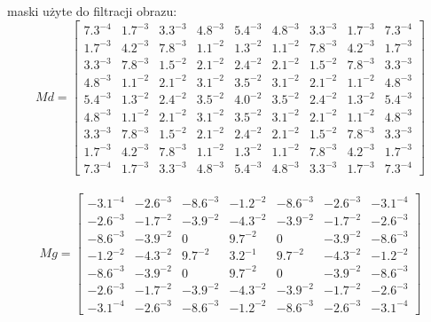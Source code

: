 \let\ww\undefined 
maski użyte do filtracji obrazu:
$$
Md = \begin{bmatrix}
7.3^{-4} & 1.7^{-3} & 3.3^{-3} & 4.8^{-3} & 5.4^{-3} & 4.8^{-3} & 3.3^{-3} & 1.7^{-3} & 7.3^{-4} \\ 
1.7^{-3} & 4.2^{-3} & 7.8^{-3} & 1.1^{-2} & 1.3^{-2} & 1.1^{-2} & 7.8^{-3} & 4.2^{-3} & 1.7^{-3} \\ 
3.3^{-3} & 7.8^{-3} & 1.5^{-2} & 2.1^{-2} & 2.4^{-2} & 2.1^{-2} & 1.5^{-2} & 7.8^{-3} & 3.3^{-3} \\ 
4.8^{-3} & 1.1^{-2} & 2.1^{-2} & 3.1^{-2} & 3.5^{-2} & 3.1^{-2} & 2.1^{-2} & 1.1^{-2} & 4.8^{-3} \\ 
5.4^{-3} & 1.3^{-2} & 2.4^{-2} & 3.5^{-2} & 4.0^{-2} & 3.5^{-2} & 2.4^{-2} & 1.3^{-2} & 5.4^{-3} \\ 
4.8^{-3} & 1.1^{-2} & 2.1^{-2} & 3.1^{-2} & 3.5^{-2} & 3.1^{-2} & 2.1^{-2} & 1.1^{-2} & 4.8^{-3} \\ 
3.3^{-3} & 7.8^{-3} & 1.5^{-2} & 2.1^{-2} & 2.4^{-2} & 2.1^{-2} & 1.5^{-2} & 7.8^{-3} & 3.3^{-3} \\ 
1.7^{-3} & 4.2^{-3} & 7.8^{-3} & 1.1^{-2} & 1.3^{-2} & 1.1^{-2} & 7.8^{-3} & 4.2^{-3} & 1.7^{-3} \\ 
7.3^{-4} & 1.7^{-3} & 3.3^{-3} & 4.8^{-3} & 5.4^{-3} & 4.8^{-3} & 3.3^{-3} & 1.7^{-3} & 7.3^{-4}
\end{bmatrix}
$$
 \\ 
$$
Mg = \begin{bmatrix}
-3.1^{-4} & -2.6^{-3} & -8.6^{-3} & -1.2^{-2} & -8.6^{-3} & -2.6^{-3} & -3.1^{-4} \\ 
-2.6^{-3} & -1.7^{-2} & -3.9^{-2} & -4.3^{-2} & -3.9^{-2} & -1.7^{-2} & -2.6^{-3} \\ 
-8.6^{-3} & -3.9^{-2} & 0 & 9.7^{-2} & 0 & -3.9^{-2} & -8.6^{-3} \\ 
-1.2^{-2} & -4.3^{-2} & 9.7^{-2} & 3.2^{-1} & 9.7^{-2} & -4.3^{-2} & -1.2^{-2} \\ 
-8.6^{-3} & -3.9^{-2} & 0 & 9.7^{-2} & 0 & -3.9^{-2} & -8.6^{-3} \\ 
-2.6^{-3} & -1.7^{-2} & -3.9^{-2} & -4.3^{-2} & -3.9^{-2} & -1.7^{-2} & -2.6^{-3} \\ 
-3.1^{-4} & -2.6^{-3} & -8.6^{-3} & -1.2^{-2} & -8.6^{-3} & -2.6^{-3} & -3.1^{-4}
\end{bmatrix}
$$